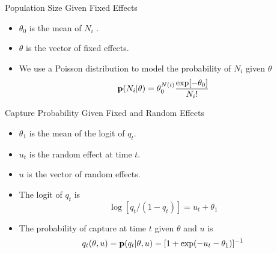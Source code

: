 \documentclass{beamer}
\newcommand{\B}[1]{{\bf #1}}
\begin{document}
\begin{frame}{Population Size Given Fixed Effects}
\begin{itemize}

\item
$\theta_0$ is the mean of $N_i$ .
\pause

\item
$\theta$ is the vector of fixed effects.
\pause

\item
We use a Poisson distribution to model the probability of $N_i$
given $\theta$
\[
\B{p} ( N_i | \theta  )
=
\theta_0^{N(i)} \frac{ \exp[ - \theta_0 ] }{ N_i ! }
\]

\end{itemize}
\end{frame}

\begin{frame}{Capture Probability Given Fixed and Random Effects}
\begin{itemize}

\item
$\theta_1$ is the mean of the logit of $q_t$.
\pause

\item
$u_t$ is the random effect at time $t$.
\pause

\item
$u$ is the vector of random effects.

\item
The logit of $q_t$ is
\[
	\log [ q_t / ( 1 - q_t ) ] = u_t + \theta_1
\]
\pause

\item
The probability of capture at time $t$ given $\theta$ and $u$ is
\[
	q_t ( \theta , u )
	=
	\B{p} ( q_t | \theta , u )
	=
	[ 1 + \exp( - u_t - \theta_1 ) ]^{-1}
\]


\end{itemize}
\end{frame}
\end{document}
